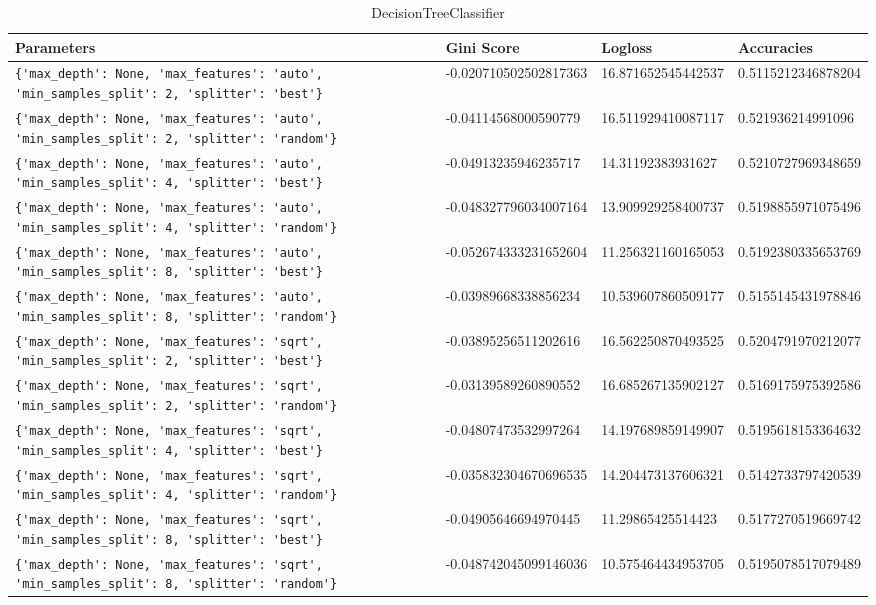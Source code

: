\begin{table} \centering
\caption{DecisionTreeClassifier} 
\label{pt:DecisionTreeClassifier} 
\begin{tabular}{llll}\toprule\bfseries Parameters & \bfseries Gini Score & \bfseries Logloss &\bfseries Accuracies \\\midrule 
\verb|{'max_depth': None, 'max_features': 'auto', 'min_samples_split': 2, 'splitter': 'best'}| & -0.020710502502817363 & 16.871652545442537 & 0.5115212346878204 \\ 
\verb|{'max_depth': None, 'max_features': 'auto', 'min_samples_split': 2, 'splitter': 'random'}| & -0.04114568000590779 & 16.511929410087117 & 0.521936214991096 \\ 
\verb|{'max_depth': None, 'max_features': 'auto', 'min_samples_split': 4, 'splitter': 'best'}| & -0.04913235946235717 & 14.31192383931627 & 0.5210727969348659 \\ 
\verb|{'max_depth': None, 'max_features': 'auto', 'min_samples_split': 4, 'splitter': 'random'}| & -0.048327796034007164 & 13.909929258400737 & 0.5198855971075496 \\ 
\verb|{'max_depth': None, 'max_features': 'auto', 'min_samples_split': 8, 'splitter': 'best'}| & -0.052674333231652604 & 11.256321160165053 & 0.5192380335653769 \\ 
\verb|{'max_depth': None, 'max_features': 'auto', 'min_samples_split': 8, 'splitter': 'random'}| & -0.03989668338856234 & 10.539607860509177 & 0.5155145431978846 \\ 
\verb|{'max_depth': None, 'max_features': 'sqrt', 'min_samples_split': 2, 'splitter': 'best'}| & -0.03895256511202616 & 16.562250870493525 & 0.5204791970212077 \\ 
\verb|{'max_depth': None, 'max_features': 'sqrt', 'min_samples_split': 2, 'splitter': 'random'}| & -0.03139589260890552 & 16.685267135902127 & 0.5169175975392586 \\ 
\verb|{'max_depth': None, 'max_features': 'sqrt', 'min_samples_split': 4, 'splitter': 'best'}| & -0.04807473532997264 & 14.197689859149907 & 0.5195618153364632 \\ 
\verb|{'max_depth': None, 'max_features': 'sqrt', 'min_samples_split': 4, 'splitter': 'random'}| & -0.035832304670696535 & 14.204473137606321 & 0.5142733797420539 \\ 
\verb|{'max_depth': None, 'max_features': 'sqrt', 'min_samples_split': 8, 'splitter': 'best'}| & -0.04905646694970445 & 11.29865425514423 & 0.5177270519669742 \\ 
\verb|{'max_depth': None, 'max_features': 'sqrt', 'min_samples_split': 8, 'splitter': 'random'}| & -0.048742045099146036 & 10.575464434953705 & 0.5195078517079489 \\ 

\end{tabular}
\end{table}
